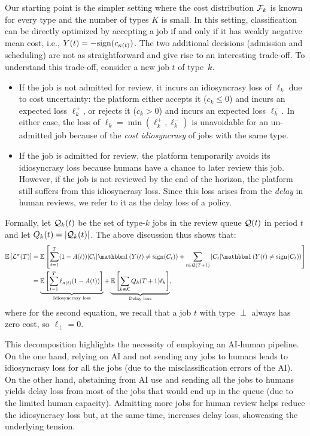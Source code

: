 Our starting point is the simpler setting where the cost distribution $\mathcal{F}_k$ is known for every type and the number of types $K$ is small. In this setting, classification can be directly optimized by accepting a job if and only if it has weakly negative mean cost, i.e., $Y(t) = -\mathrm{sign}(c_{\kappa(t)})$. 
The two additional decisions (admission and scheduling) are not as straightforward and give rise to an interesting trade-off. To understand this trade-off, consider a new job $t$ of type~$k$. 
\begin{itemize}
    \item If the job is not admitted for review, it incurs an idiosyncrasy loss of $\ell_k$ due to cost uncertainty: the platform either accepts it ($c_k \leq 0$) and incurs an expected loss $\ell_k^+$, or rejects it ($c_k > 0$) and incurs an expected loss $\ell_k^-$. In either case, the loss of $\ell_k = \min(\ell_k^+,\ell_k^-)$ is unavoidable for an un-admitted job because of the \emph{cost idiosyncrasy} of jobs with the same type.
    \item If the job is admitted for review, the platform temporarily avoids its idiosyncrasy loss because humans have a chance to later review this job. However, if the job is not reviewed by the end of the horizon, the platform still suffers from this idiosyncrasy loss. Since this loss arises from the \emph{delay} in human reviews, we refer to it as the delay loss of a policy.
\end{itemize} 
Formally, let $\mathcal{Q}_k(t)$ be the set of type-$k$ jobs in the review queue $\mathcal{Q}(t)$ in period $t$ and let $Q_k(t) = |\mathcal{Q}_k(t)|$. The above discussion thus shows that: 
\begin{align}
\expect{\set{L}^{\pi}(T)} &= \expect{\sum_{t=1}^T (1-A(t))|C_t|\indic{Y(t) \neq \sign(C_t)} + \sum_{t \in \set{Q}(T+1)} |C_t|\indic{Y(t) \neq \sign(C_t)}} \nonumber\\
&= \underbrace{\expect{\sum_{t=1}^T  \ell_{\kappa(t)}(1-A(t))}}_{\text{Idiosyncrasy loss}} + \underbrace{\expect{\sum_{k \in \set{K}} Q_k(T+1)\ell_k}}_{\text{Delay loss}} \label{eq:loss-decompose},
\end{align}
where for the second equation, we recall that a job $t$ with type $\perp$ always has zero cost, so $\ell_{\perp} = 0$.

This decomposition highlights the necessity of employing an AI-human pipeline. On the one hand, relying on AI and not sending any jobs to humans leads to idiosyncrasy loss for all the jobs (due to the misclassification errors of the AI). On the other hand, abstaining from AI use and sending all the jobs to humans yields delay loss from most of the jobs that would end up in the queue (due to the limited human capacity). Admitting more jobs for human review helps reduce the idiosyncracy loss but, at the same time, increases delay loss, showcasing the underlying tension. 

